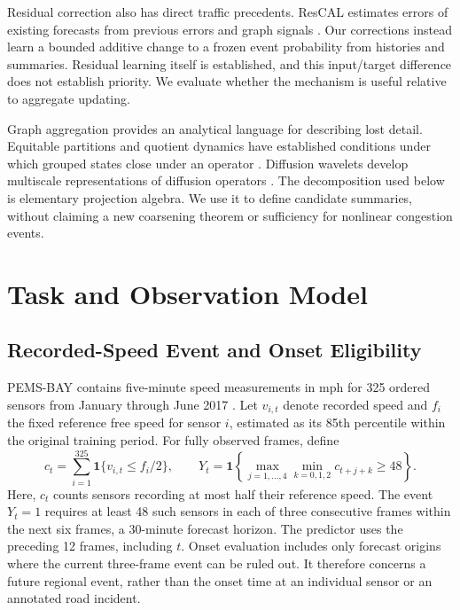 \documentclass{llncs}
\begin{document}
Residual correction also has direct traffic precedents. ResCAL estimates errors of existing forecasts from previous errors and graph signals \cite{rescal}. Our corrections instead learn a bounded additive change to a frozen event probability from histories and summaries. Residual learning itself is established, and this input/target difference does not establish priority. We evaluate whether the mechanism is useful relative to aggregate updating.

Graph aggregation provides an analytical language for describing lost detail. Equitable partitions and quotient dynamics have established conditions under which grouped states close under an operator \cite{schaub}. Diffusion wavelets develop multiscale representations of diffusion operators \cite{diffusion}. The decomposition used below is elementary projection algebra. We use it to define candidate summaries, without claiming a new coarsening theorem or sufficiency for nonlinear congestion events.







\section{Task and Observation Model}
\subsection{Recorded-Speed Event and Onset Eligibility}
PEMS-BAY contains five-minute speed measurements in mph for 325 ordered sensors from January through June 2017 \cite{dcrnn,release}. Let $v_{i,t}$ denote recorded speed and $f_i$ the fixed reference free speed for sensor $i$, estimated as its 85th percentile within the original training period. For fully observed frames, define
\begin{equation}
 c_t=\sum_{i=1}^{325}\mathbf{1}\{v_{i,t}\leq f_i/2\},\qquad
 Y_t=\mathbf{1}\!\left\{\max_{j=1,\ldots,4}\min_{k=0,1,2}c_{t+j+k}\geq48\right\}.
\label{eq:target}
\end{equation}
Here, $c_t$ counts sensors recording at most half their reference speed. The event $Y_t=1$ requires at least 48 such sensors in each of three consecutive frames within the next six frames, a 30-minute forecast horizon. The predictor uses the preceding 12 frames, including $t$. Onset evaluation includes only forecast origins where the current three-frame event can be ruled out. It therefore concerns a future regional event, rather than the onset time at an individual sensor or an annotated road incident.
\end{document}
